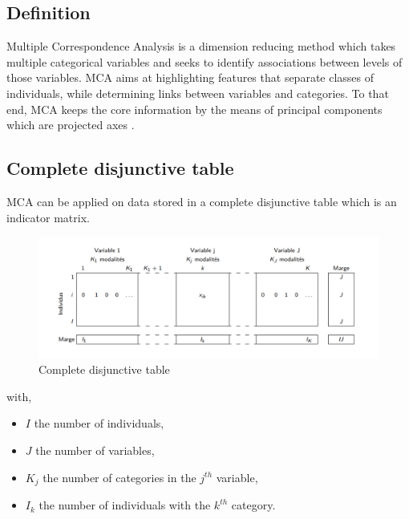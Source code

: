 \documentclass[
]{book}
\providecommand{\tightlist}{%
  \setlength{\itemsep}{0pt}\setlength{\parskip}{0pt}}
\begin{document}
\hypertarget{definition-1}{%
\subsection{Definition}\label{definition-1}}

Multiple Correspondence Analysis is a dimension reducing method which takes multiple categorical variables and seeks to identify associations between levels of those variables. MCA aims at highlighting features that separate classes of individuals, while determining links between variables and categories. To that end, MCA keeps the core information by the means of principal components which are projected axes \citep{MCA}.

\hypertarget{complete-disjunctive-table}{%
\subsection{Complete disjunctive table}\label{complete-disjunctive-table}}

MCA can be applied on data stored in a complete disjunctive table which is an indicator matrix.

\begin{figure}

{\centering \includegraphics[width=20.76in]{./imgs/TDC} 

}

\caption{Complete disjunctive table}\label{fig:tdc}
\end{figure}

with,

\begin{itemize}
\tightlist
\item
  \(I\) the number of individuals,
\item
  \(J\) the number of variables,
\item
  \(K_j\) the number of categories in the \(j^{th}\) variable,
\item
  \(I_k\) the number of individuals with the \(k^{th}\) category.
\end{itemize}
\end{document}
